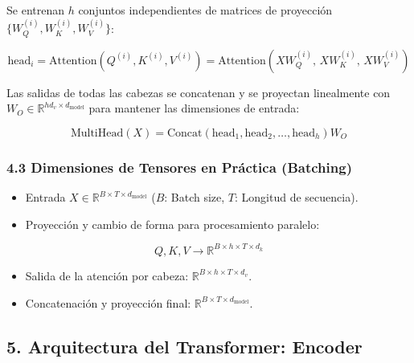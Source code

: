 \documentclass[11pt,oneside]{article}
\begin{document}
Se entrenan \(h\) conjuntos independientes de matrices de proyección \(\{W_Q^{(i)}, W_K^{(i)}, W_V^{(i)}\}\):

\[\text{head}_i = \text{Attention}\left(Q^{(i)}, K^{(i)}, V^{(i)}\right) = \text{Attention}\left(X W_Q^{(i)}, \, X W_K^{(i)}, \, X W_V^{(i)}\right)\]

Las salidas de todas las cabezas se concatenan y se proyectan linealmente con \(W_O \in \mathbb{R}^{h d_v \times d_{\text{model}}}\) para mantener las dimensiones de entrada:

\[\text{MultiHead}(X) = \text{Concat}(\text{head}_1, \text{head}_2, \dots, \text{head}_h) W_O\]

\subsubsection{4.3 Dimensiones de Tensores en Práctica (Batching)}

\begin{itemize}

\item Entrada \(X \in \mathbb{R}^{B \times T \times d_{\text{model}}}\) (\(B\): Batch size, \(T\): Longitud de secuencia).

\end{itemize}

\begin{itemize}

\item Proyección y cambio de forma para procesamiento paralelo:

\end{itemize}

\[Q, K, V \rightarrow \mathbb{R}^{B \times h \times T \times d_k}\]

\begin{itemize}

\item Salida de la atención por cabeza: \(\mathbb{R}^{B \times h \times T \times d_v}\).

\end{itemize}

\begin{itemize}

\item Concatenación y proyección final: \(\mathbb{R}^{B \times T \times d_{\text{model}}}\).

\end{itemize}

\subsection{5. Arquitectura del Transformer: Encoder}
\end{document}
